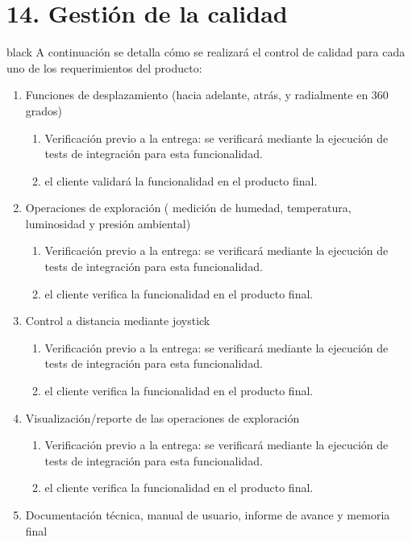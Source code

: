 \documentclass[
11pt, %
codirector, %
]{charter}
\begin{document}
\section{14. Gestión de la calidad}
\label{sec:calidad}
\begin{consigna}{black}
A continuación se detalla cómo se realizará el control de calidad para cada uno de los requerimientos del producto:
\begin{enumerate}	
			
		\item Funciones de desplazamiento (hacia adelante, atrás, y radialmente en 360 grados)
		\begin{enumerate}				
			\item Verificación previo a la entrega: se verificará mediante la ejecución de tests de integración para esta funcionalidad.			
			\item el cliente validará la funcionalidad en el producto final.			
		\end{enumerate}		
		\item Operaciones de exploración ( medición de humedad, temperatura, luminosidad y presión ambiental)
		\begin{enumerate}				
			\item Verificación previo a la entrega: se verificará mediante la ejecución de tests de integración para esta funcionalidad.			
			\item el cliente verifica la funcionalidad en el producto final.			
		\end{enumerate}		
		\item Control a distancia mediante joystick
		\begin{enumerate}				
			\item Verificación previo a la entrega: se verificará mediante la ejecución de tests de integración para esta funcionalidad.			
			\item el cliente verifica la funcionalidad en el producto final.			
		\end{enumerate}			
		\item Visualización/reporte de las operaciones de exploración 
		\begin{enumerate}				
			\item Verificación previo a la entrega: se verificará mediante la ejecución de tests de integración para esta funcionalidad.			
			\item el cliente verifica la funcionalidad en el producto final.			
		\end{enumerate}			
		\item Documentación técnica, manual de usuario, informe de avance y memoria final

\end{enumerate}
\end{consigna}
\end{document}
